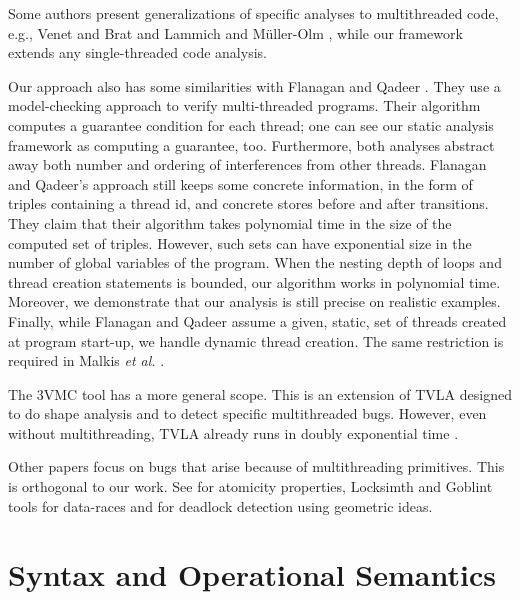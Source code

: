 \documentclass[12pt]{article}
\begin{document}
Some authors present generalizations of specific analyses to multithreaded code, e.g., Venet and Brat \cite{996869} and Lammich and M\"uller-Olm \cite{DBLP:conf/concur/LammichM07}, while our framework extends any single-threaded code analysis.



Our approach also has some similarities with Flanagan and Qadeer \cite{DBLP:conf/spin/FlanaganQ03}.
 They use a
model-checking approach to verify multi-threaded programs.
Their algorithm computes a guarantee condition for each thread; 
one can see our static analysis framework as computing a guarantee, too.
Furthermore, both analyses abstract away both number and ordering
of interferences from other threads.  Flanagan and Qadeer's approach
still keeps some concrete information, in the form of triples containing a
thread id, and concrete stores before and after transitions.  They
claim that their algorithm takes polynomial time in the size of
the computed set of triples.  However, such sets can have exponential
size in the number of global variables of the program.  When the
nesting depth of loops and thread creation statements is bounded,
our algorithm works in polynomial time.  Moreover, we demonstrate
that our analysis is still precise on realistic examples.
Finally, while Flanagan and Qadeer assume a given, static, set of
threads created at program start-up, we handle dynamic thread
creation.
The same restriction is required in Malkis \emph{et al.\@} \cite{DBLP:conf/sas/MalkisPR07}.

The 3VMC tool \cite{360206} has a more general scope. This is an extension of TVLA designed to do shape analysis and to detect specific multithreaded bugs. However, even without multithreading, TVLA already runs in doubly exponential time \cite{repsperso}.

Other papers focus on bugs that arise because of multithreading primitives. This is orthogonal to our work. See \cite{1040299,reduction75} for atomicity properties, Locksimth and Goblint tools \cite{locksmith,SPLST/Vojdani07,Vene03globalinvariants} for data-races and \cite{701315} for deadlock detection using geometric ideas.


\section{Syntax and Operational Semantics}
\label{syntax}

\figsyntax

\examples
\end{document}
